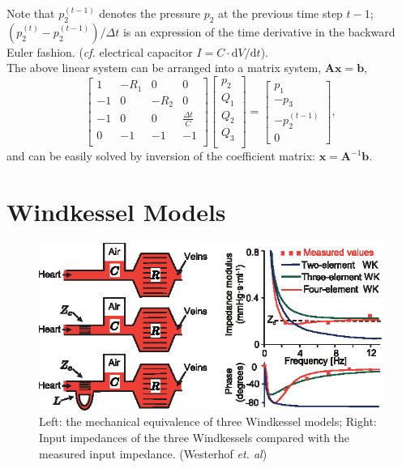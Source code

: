 \documentclass[a4paper]{article}
\begin{document}
\vspace{.3cm}
Note that $p_2^{(t-1)}$ denotes the pressure $p_2$ at the previous time step $t-1$; $(p_2^{(t)} - p_2^{(t-1)})/\Delta t$ is an expression of the time derivative in the backward Euler fashion. {\color{gray}(\textit{cf.} electrical capacitor $I = C \cdot \mathrm{d}V/\mathrm{d}t$).}\\

The above linear system can be arranged into a matrix system, $\mathbf{A}\mathbf{x} = \mathbf{b}$,
\[
    \begin{bmatrix}
        1 & -R_1 & 0 & 0 \\
        -1 & 0 & -R_2 & 0 \\
        -1 & 0 & 0 & \frac{\Delta t}{C} \\
        0 & -1 & -1 & -1\\
    \end{bmatrix}
    \begin{bmatrix}
        p_2 \\
        Q_1 \\
        Q_2 \\
        Q_3\\
    \end{bmatrix}
    =
    \begin{bmatrix}
        p_1 \\
        -p_3 \\
        -p_2^{(t-1)} \\
        0
    \end{bmatrix},
\]
and can be easily solved by inversion of the coefficient matrix: $\mathbf{x} = \mathbf{A}^{-1}\mathbf{b}$.
\section{Windkessel Models}
\begin{figure}[H]
    \centering
    \includegraphics[width=.6\textwidth]{img/winkessel_plot_snapshot.eps}
    \caption{Left: the mechanical equivalence of three Windkessel models; Right: Input impedances of the three Windkessels compared with the measured input impedance. {\color{gray} (Westerhof \textit{et. al})}}
    \label{fig:wk_snapshot}
\end{figure}
\end{document}
